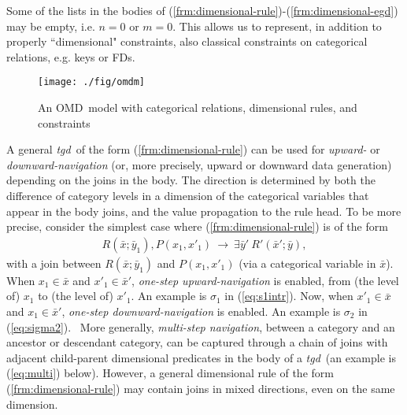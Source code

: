 \documentclass[format=acmsmall, review=false, screen=true]{acmart}
\newcommand{\mc}[1]{\mathcal{ #1}}
\newcommand{\dpm}{{Datalog}$^\pm$}
\newcommand{\rules}{\Pi^{R}}
\newcommand{\constraints}{\Pi^{C}}
\newcommand{\prg}{\Pi}
\newcommand{\schema}{\mc{R}}
\newcommand{\omd}{OMD}
\newcommand{\md}{MD}
\newcommand{\fds}{FDs}
\newcommand{\tgd}{{\em tgd}}
\newcommand{\red}[1]{{#1}}
\newcommand{\blue}[1]{{#1}}
\begin{document}
\vspace{2mm}

Some of the lists in the bodies of (\ref{frm:dimensional-rule})-(\ref{frm:dimensional-egd}) may be empty, i.e. $n=0$ or $m=0$. This allows us to represent, in addition to properly ``dimensional" constraints, also classical constraints on categorical relations, e.g. keys or \fds.


\begin{figure}[ht]
\begin{center}
\vspace{-1mm}
 \texttt{[image: ./fig/omdm]}
 \caption{An \omd \ model with categorical relations, dimensional rules, and constraints}\label{fig:omdm} \vspace{-5mm}
\end{center}
\end{figure}

\blue{A general \tgd \ of the form (\ref{frm:dimensional-rule}) can be used for  {\em upward-} or {\em downward-navigation} (or, more precisely, upward or downward data generation) depending on the joins in the body. The direction is determined by both the difference of category levels in a dimension of the categorical variables that appear in the body joins, and the value propagation to the rule head. To be more precise, consider the simplest case where (\ref{frm:dimensional-rule}) is of the form
\begin{align*}
R(\bar{x};\bar{y}_1), P(x_1,x'_1) \ \rightarrow \ \exists \bar{y}' \ \red{R'}(\red{\bar{x}'};\bar{y}),%
\end{align*}
with a join between $R(\bar{x};\bar{y}_1)$ and $P(x_1,x'_1)$ (via a categorical variable in $\bar{x}$). When $x_1 \in \bar{x}$ and $x'_1 \in \bar{x}'$, {\em one-step upward-navigation} is enabled, from (the level of) $x_1$ to (the level of) $x'_1$. An example is $\sigma_1$ in (\ref{eq:s1intr}). Now, when $x'_1 \in \bar{x}$ and $x_1 \in \bar{x}'$, {\em one-step downward-navigation} is enabled. An example is $\sigma_2$ in (\ref{eq:sigma2}). \
More generally, {\em multi-step navigation}, between a category and an ancestor or descendant category, can be captured through a  chain of joins with adjacent  child-parent dimensional predicates in the body of a \tgd \ (an example is (\ref{eq:multi}) below). However, a general dimensional rule of the  form (\ref{frm:dimensional-rule}) may contain joins in mixed directions, even on the same dimension.}
\end{document}
